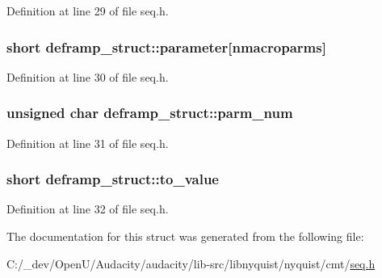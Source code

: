 Definition at line 29 of file seq.\+h.

\subsubsection[{\texorpdfstring{parameter}{parameter}}]{\setlength{\rightskip}{0pt plus 5cm}short deframp\+\_\+struct\+::parameter\mbox{[}{\bf nmacroparms}\mbox{]}}\hypertarget{structdeframp__struct_a3af41769cb6ffb381b857ba3b53e03c3}{}\label{structdeframp__struct_a3af41769cb6ffb381b857ba3b53e03c3}


Definition at line 30 of file seq.\+h.

\subsubsection[{\texorpdfstring{parm\+\_\+num}{parm_num}}]{\setlength{\rightskip}{0pt plus 5cm}unsigned char deframp\+\_\+struct\+::parm\+\_\+num}\hypertarget{structdeframp__struct_ae9d238b85cf184eab9b4da04c615709b}{}\label{structdeframp__struct_ae9d238b85cf184eab9b4da04c615709b}


Definition at line 31 of file seq.\+h.

\subsubsection[{\texorpdfstring{to\+\_\+value}{to_value}}]{\setlength{\rightskip}{0pt plus 5cm}short deframp\+\_\+struct\+::to\+\_\+value}\hypertarget{structdeframp__struct_a777fd139d35fcf121fdc4bb5155ccd09}{}\label{structdeframp__struct_a777fd139d35fcf121fdc4bb5155ccd09}


Definition at line 32 of file seq.\+h.



The documentation for this struct was generated from the following file\+:\begin{DoxyCompactItemize}
\item 
C\+:/\+\_\+dev/\+Open\+U/\+Audacity/audacity/lib-\/src/libnyquist/nyquist/cmt/\hyperlink{seq_8h}{seq.\+h}\end{DoxyCompactItemize}
